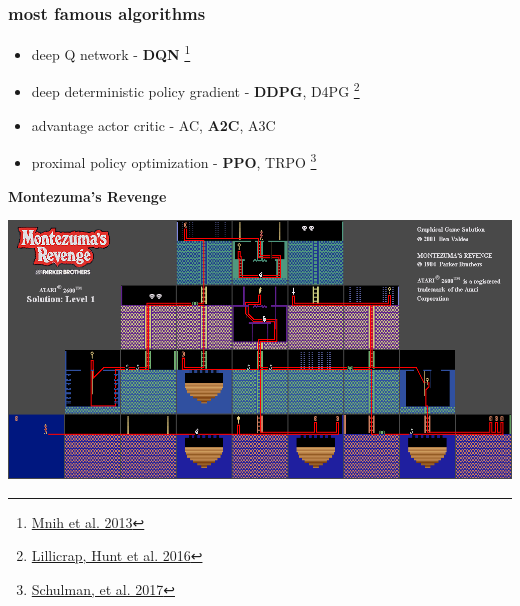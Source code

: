 \documentclass{beamer}
\begin{document}
\begin{frame}
  
  \frametitle{most famous algorithms} 

  \begin{itemize}
    \item deep Q network - {\bf DQN} \footnote{\href{https://arxiv.org/pdf/1312.5602.pdf}{Mnih et al. 2013}}
    \item deep deterministic policy gradient - {\bf DDPG}, D4PG \footnote{\href{https://arxiv.org/pdf/1509.02971.pdf}{Lillicrap, Hunt et al. 2016}}
    \item advantage actor critic - AC, {\bf A2C}, A3C
    \item proximal policy optimization - {\bf PPO}, TRPO \footnote{\href{https://arxiv.org/pdf/1707.06347.pdf}{Schulman, et al. 2017}}
  \end{itemize}

\end{frame}



\begin{frame}{\bf Montezuma's Revenge}

  \includegraphics[scale=0.32]{../images/montezuma_map.png}
  
  \end{frame}
  
\end{document}
